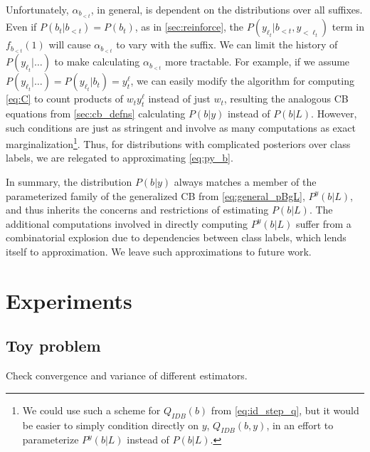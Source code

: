 \documentclass{article}
\begin{document}
Unfortunately, $\alpha_{b_{<t}}$, in general, is dependent on the distributions
over all suffixes. Even if $P(b_t|b_{<t}) = P(b_t)$, as in
\cref{sec:reinforce}, the $P(y_{\ell_t}|b_{<t}, y_{< \ell_t})$ term in
$f_{b_{<t}}(1)$ will cause $\alpha_{b_{<t}}$ to vary with the suffix. We can
limit the history of $P(y_{\ell_t}|\ldots)$ to make calculating
$\alpha_{b_{<t}}$ more tractable. For example, if we assume
$P(y_{\ell_t}|\ldots) = P(y_{\ell_t}|b_t) = y_t^\ell$, we can easily modify the
algorithm for computing \cref{eq:C} to count products of $w_t y_t^\ell$ instead
of just $w_t$, resulting the analogous CB equations from \cref{sec:cb_defns}
calculating $P(b|y)$ instead of $P(b|L)$. However, such conditions are just as
stringent and involve as many computations as exact marginalization\footnote{
%
    We could use such a scheme for $Q_{IDB}(b)$ from \cref{eq:id_step_q},
    but it would be easier to simply condition directly on $y$, $Q_{IDB}(b,y)$,
    in an effort to parameterize $P^y(b|L)$ instead of $P(b|L)$.
%
}. Thus, for distributions with complicated posteriors over class labels, we
are relegated to approximating \cref{eq:py_b}.

In summary, the distribution $P(b|y)$ always matches a member of the
parameterized family of the generalized CB from \cref{eq:general_pBgL},
$P^y(b|L)$, and thus inherits the concerns and restrictions of estimating
$P(b|L)$. The additional computations involved in directly computing $P^y(b|L)$
suffer from a combinatorial explosion due to dependencies between class labels,
which lends itself to approximation. We leave such approximations to future
work.

\section{Experiments} \label{sec:experiments}

\subsection{Toy problem}

Check convergence and variance of different estimators.
\end{document}
